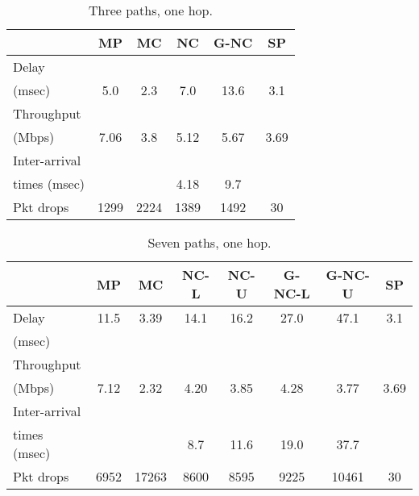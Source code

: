 \documentclass[journal, onecolumn, 12pt]{IEEEtran}
\begin{document}
\begin{table}[t]
\begin{center}
\scriptsize
\begin{tabular}{|l|c|c|c|c|c|}
\hline
~                                    & MP & MC & NC & G-NC & SP \\ \hline
Delay           &   &   &  &  & \\
(msec)   & 5.0   & 2.3  & 7.0  & 13.6 & 3.1  \\ \hline
Throughput                   & ~  & ~  & ~  & ~         & ~  \\
(Mbps)                   & 7.06  & 3.8  & 5.12 & 5.67 & 3.69\\ \hline
Inter-arrival              & ~  & ~  & ~  & ~         & ~  \\
times (msec)   &   &   &  4.18 & 9.7 & \\ \hline
Pkt drops  & 1299  & 2224  & 1389  & 1492 & 30 \\ \hline
\end{tabular}
\end{center}
\caption {Three paths, one hop. }
\label{tab:sim_topol_4}
\end{table}

\begin{table}
\begin{center}
\scriptsize
\begin{tabular}{|l|c|c|c|c|c|c|c|}
\hline
~                                   & MP & MC & NC-L & NC-U & G-NC-L & G-NC-U & SP \\ \hline
Delay           &  11.5 &  3.39 & 14.1 & 16.2 & 27.0 & 47.1 & 3.1\\
(msec)           &   &  &   &   &   &  &  \\ \hline
Throughput             & ~  & ~  & ~    & ~    & ~           & ~           & ~  \\
(Mbps)                 & 7.12 & 2.32  & 4.20 & 3.85 & 4.28 & 3.77 & 3.69\\ \hline
Inter-arrival             & ~  & ~  & ~    & ~    & ~           & ~           & ~  \\
times (msec)   &   &   & 8.7 & 11.6 & 19.0 & 37.7 &  \\ \hline
Pkt drops       & 6952 & 17263 &  8600 & 8595  & 9225 & 10461 & 30 \\ \hline
\end{tabular}
\end{center}
\caption {Seven paths, one hop. }
\label{tab:sim_topol_5}
\end{table}
\end{document}
